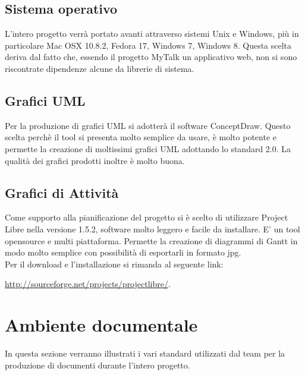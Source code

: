 \subsection{Sistema operativo}
L'intero progetto verrà portato avanti attraverso sistemi Unix e Windows, più in particolare Mac OSX 10.8.2, Fedora 17, Windows 7, Windows 8. Questa scelta deriva dal fatto che, essendo il progetto MyTalk un applicativo web, non si sono riscontrate dipendenze alcune da librerie di sistema.

\subsection{Grafici UML}
Per la produzione di grafici UML si adotterà il software ConceptDraw. Questo scelta perchè il tool si presenta molto semplice da usare, è molto potente e permette la creazione di moltissimi grafici UML adottando lo standard 2.0. La qualità dei grafici prodotti inoltre è molto buona.

\subsection{Grafici di Attività}
Come supporto alla pianificazione del progetto si è scelto di utilizzare Project Libre nella versione 1.5.2, software molto leggero e facile da installare. E' un tool opensource e multi piattaforma. Permette la creazione di diagrammi di Gantt in modo molto semplice con possibilità di esportarli in formato jpg.\\
Per il download e l'installazione si rimanda al seguente link:
\begin{center}
\url{http://sourceforge.net/projects/projectlibre/}.
\end{center}

\newpage
\section{Ambiente documentale}
\label{sec:ambiente_documentale}
In questa sezione verranno illustrati i vari standard utilizzati dal team per la produzione di documenti durante l'intero progetto. 

